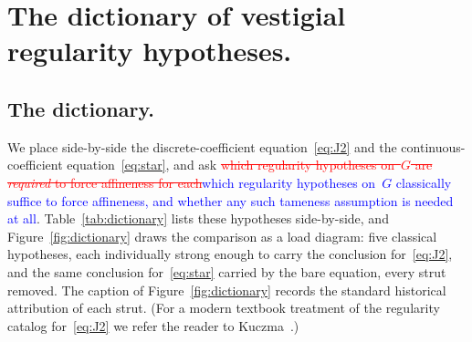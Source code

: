 \documentclass{article}
\newcommand{\ReviewAdd}[1]{\textcolor{blue}{#1}}
\newcommand{\ReviewDel}[1]{\textcolor{red}{\sout{#1}}}
\theoremstyle{plain}
\theoremstyle{definition}
\begin{document}
\section{The dictionary of vestigial regularity hypotheses.}
\label{sec:dictionary}

\subsection{The dictionary.}
\label{ssec:dict-table}

We place side-by-side the discrete-coefficient equation~\eqref{eq:J2}
and the continuous-coefficient equation~\eqref{eq:star}, and ask \ReviewDel{which
regularity hypotheses on~$G$ are \emph{required} to force affineness
for each}\ReviewAdd{which regularity hypotheses on~$G$ classically suffice to force affineness, and whether any such tameness assumption is needed at all}. Table~\ref{tab:dictionary} lists these hypotheses side-by-side,
and Figure~\ref{fig:dictionary} draws the comparison as a load
diagram: five classical hypotheses, each individually strong enough
to carry the conclusion for~\eqref{eq:J2}, and the same conclusion
for~\eqref{eq:star} carried by the bare equation, every strut
removed. The caption of Figure~\ref{fig:dictionary} records the standard historical attribution of
each strut. (For a modern textbook treatment of the regularity
catalog for~\eqref{eq:J2} we refer the reader to
Kuczma~\cite[\S13.2]{Kuczma2009}.)
\end{document}
